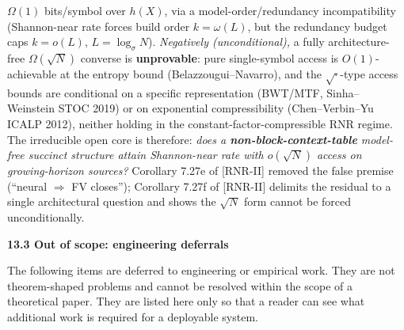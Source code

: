 \documentclass[
]{article}
\begin{document}
\begin{itemize}
  $\Omega(1)$ bits/symbol over $h(X)$, via a model-order/redundancy
  incompatibility (Shannon-near rate forces build order $k = \omega(L)$,
  but the redundancy budget caps $k = o(L)$, $L = \log_\sigma N$).
  \emph{Negatively (unconditional),} a fully architecture-free $\Omega(\sqrt
  N)$ converse is \textbf{unprovable}: pure single-symbol access is
  $O(1)$-achievable at the entropy bound (Belazzougui--Navarro), and the $\sqrt{\cdot}$-type access
  bounds are conditional on a specific representation (BWT/MTF,
  Sinha--Weinstein STOC 2019) or on exponential compressibility
  (Chen--Verbin--Yu ICALP 2012), neither holding in the
  constant-factor-compressible RNR regime. The irreducible open core is
  therefore: \emph{does a \textbf{non-block-context-table} model-free
  succinct structure attain Shannon-near rate with $o(\sqrt N)$ access on
  growing-horizon sources?} Corollary 7.27e of [RNR-II] removed the false premise
  (``neural $\Rightarrow$ FV closes''); Corollary 7.27f of [RNR-II] delimits the
  residual to a single architectural question and shows the $\sqrt N$
  form cannot be forced unconditionally.
\end{itemize}

\textbf{13.3 Out of scope: engineering deferrals}

The following items are deferred to engineering or empirical work. They
are not theorem-shaped problems and cannot be resolved within the scope
of a theoretical paper. They are listed here only so that a reader can
see what additional work is required for a deployable system.
\end{document}
